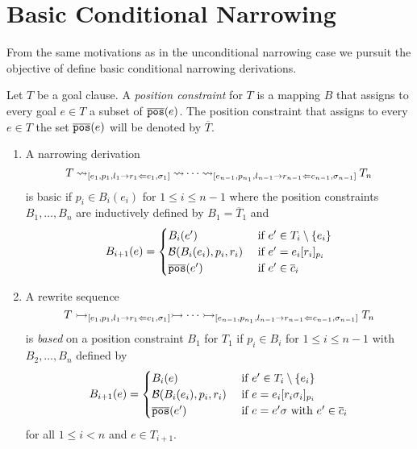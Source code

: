 \section{Basic Conditional Narrowing}
From the same motivations as in the unconditional narrowing case we pursuit the objective of define basic conditional narrowing derivations.

\begin{definition}
    Let $T$ be a goal clause. A \textit{position constraint} for $T$ is a mapping $B$ that assigns to every goal $e \in T$ a subset of $\overline{\mathtt{pos}}(e)$. The position constraint that assigns to every $e \in T$ the set $\overline{\mathtt{pos}}(e)$ will be denoted by $\overline{T}$.
\end{definition}

\begin{definition}
    \begin{enumerate}
        \item A narrowing derivation
        $$T \mathbin{\rightsquigarrow}_{[e_1, p_1, l_1 \rightarrow r_1 \Leftarrow c_1, \sigma_1]} \mathbin{\rightsquigarrow} \cdots \mathbin{\rightsquigarrow}_{[e_{n-1}, p_{n_1}, l_{n-1} \rightarrow r_{n-1} \Leftarrow c_{n-1}, \sigma_{n-1}]} T_n$$
        is basic if $p_i \in B_i(e_i)$ for $1 \leq i \leq n - 1$ where the position constraints $B_1, \dots, B_n$ are inductively defined by $B_1 = \overline{T}_1$ and
        \begin{displaymath}
            B_{i+1}(e) =
            \begin{cases}
                B_i(e') & \text{ if } e' \in T_i \setminus \{e_i\} \\
                \mathcal{B}(B_i(e_i), p_i, r_i) & \text{ if } e' = e_i[r_i]_{p_i} \\
                \overline{\mathtt{pos}}(e') & \text{ if } e' \in \overline{c}_i
            \end{cases}
        \end{displaymath}
        \item A rewrite sequence
        $$T \rightarrowtail_{[e_1, p_1, l_1 \rightarrow r_1 \Leftarrow c_1, \sigma_1]} \rightarrowtail \cdots \rightarrowtail_{[e_{n-1}, p_{n_1}, l_{n-1} \rightarrow r_{n-1} \Leftarrow c_{n-1}, \sigma_{n-1}]} T_n$$
        is \textit{based} on a position constraint $B_1$ for $T_1$ if $p_i \in B_i$ for $1 \leq i \leq n - 1$ with $B_2, \dots, B_n$ defined by
        \begin{displaymath}
            B_{i+1}(e) =
            \begin{cases}
                B_i(e) & \text{ if } e' \in T_i \setminus \{e_i\} \\
                \mathcal{B}(B_i(e_i), p_i, r_i) & \text{ if } e = e_i[r_i\sigma_i]_{p_i} \\
                \overline{\mathtt{pos}}(e') & \text{ if } e=e'\sigma \text{ with } e' \in \overline{c}_i
            \end{cases}
        \end{displaymath}
        for all $1 \leq i < n$ and $e \in T_{i+1}$.
    \end{enumerate}
\end{definition}

